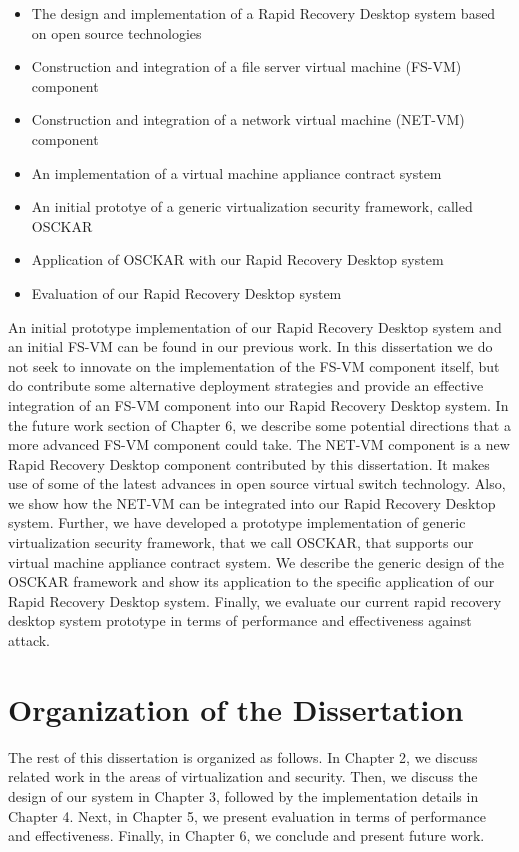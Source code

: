 \begin{itemize}

\item The design and implementation of a Rapid Recovery Desktop system based on open source technologies 

\item Construction and integration of a file server virtual machine (FS-VM) component

\item Construction and integration of a network virtual machine (NET-VM) component

\item An implementation of a virtual machine appliance contract system

\item An initial prototye of a generic virtualization security framework, called OSCKAR

\item Application of OSCKAR with our Rapid Recovery Desktop system

\item Evaluation of our Rapid Recovery Desktop system

\end{itemize}

An initial prototype implementation of our Rapid Recovery Desktop system and an initial FS-VM can be found in our previous work\cite{rapid_recovery_paper_05}. In this dissertation we do not seek to innovate on the implementation of the FS-VM component itself, but do contribute some alternative deployment strategies and provide an effective integration of an FS-VM component into our Rapid Recovery Desktop system. In the future work section of Chapter 6, we describe some potential directions that a more advanced FS-VM component could take. The NET-VM component is a new Rapid Recovery Desktop component contributed by this dissertation. It makes use of some of the latest advances in open source virtual switch technology. Also, we show how the NET-VM can be integrated into our Rapid Recovery Desktop system. Further, we have developed a prototype implementation of generic virtualization security framework, that we call OSCKAR, that supports our virtual machine appliance contract system. We describe the generic design of the OSCKAR framework and show its application to the specific application of our Rapid Recovery Desktop system. Finally, we evaluate our current rapid recovery desktop system prototype in terms of performance and effectiveness against attack.

\section{Organization of the Dissertation}

The rest of this dissertation is organized as follows. In Chapter 2, we discuss related work in the areas of virtualization and security. Then, we discuss the design of our system in Chapter 3, followed by the implementation details in Chapter 4. Next, in Chapter 5, we present evaluation in terms of performance and effectiveness. Finally, in Chapter 6, we conclude and present future work.


